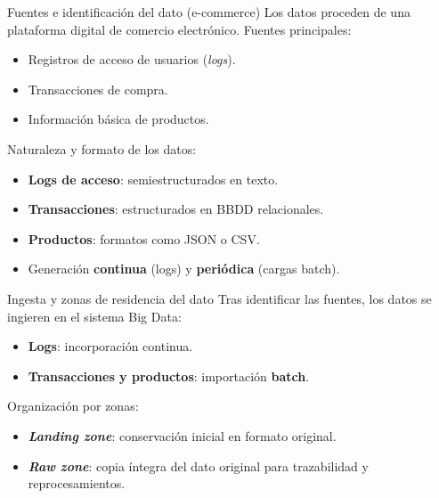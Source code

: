 \documentclass{beamer}
\begin{document}
\begin{frame}{Fuentes e identificación del dato (e-commerce)}
Los datos proceden de una plataforma digital de comercio electrónico. Fuentes principales:
\begin{itemize}
    \item Registros de acceso de usuarios (\textit{logs}).
    \item Transacciones de compra.
    \item Información básica de productos.
\end{itemize}

\medskip
Naturaleza y formato de los datos:
\begin{itemize}
    \item \textbf{Logs de acceso}: semiestructurados en texto.
    \item \textbf{Transacciones}: estructurados en BBDD relacionales.
    \item \textbf{Productos}: formatos como JSON o CSV.
    \item Generación \textbf{continua} (logs) y \textbf{periódica} (cargas batch).
\end{itemize}
\end{frame}

\begin{frame}{Ingesta y zonas de residencia del dato}
Tras identificar las fuentes, los datos se ingieren en el sistema Big Data:
\begin{itemize}
    \item \textbf{Logs}: incorporación continua.
    \item \textbf{Transacciones y productos}: importación \textbf{batch}.
\end{itemize}

\medskip
Organización por zonas:
\begin{itemize}
    \item \textbf{\textit{Landing zone}}: conservación inicial en formato original.
    \item \textbf{\textit{Raw zone}}: copia íntegra del dato original para trazabilidad y reprocesamientos.
\end{itemize}
\end{frame}
\end{document}
